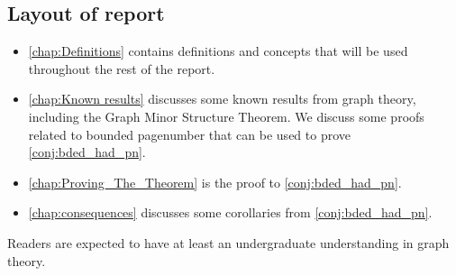 \subsection{Layout of report}
\begin{itemize}
	\item \cref{chap:Definitions} contains definitions and concepts that will be used throughout the rest of the report.
	\item \cref{chap:Known results} discusses some known results from graph theory, including the Graph Minor Structure Theorem. We discuss some proofs related to bounded pagenumber that can be used to prove \cref{conj:bded_had_pn}.

	\item \cref{chap:Proving_The_Theorem} is the proof to \cref{conj:bded_had_pn}. 
	\item \cref{chap:consequences} discusses some corollaries from \cref{conj:bded_had_pn}. 
\end{itemize}
Readers are expected to have at least an undergraduate understanding in graph theory.
